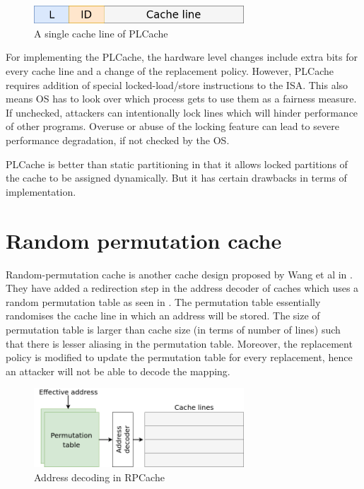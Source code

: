 \begin{figure}
    \centering
    \includegraphics[width=0.7\textwidth]{pl-cache}
    \caption{A single cache line of PLCache}
    \label{fig:plcache}
\end{figure}

For implementing the PLCache, the hardware level changes include extra bits for every cache line and a change of the
replacement policy. However, PLCache requires addition of special locked-load/store instructions to the ISA. This
also means OS has to look over which process gets to use them as a fairness measure. If unchecked, attackers can intentionally
lock lines which will hinder performance of other programs. Overuse or abuse of the locking feature can lead to severe
performance degradation, if not checked by the OS.

PLCache is better than static partitioning in that it allows locked partitions of the cache to be assigned dynamically.
But it has certain drawbacks in terms of implementation.

\section{Random permutation cache}

Random-permutation cache is another cache design proposed by Wang et al in .
They have added a redirection step in the address decoder of caches which uses a random permutation
table as seen in . 
The permutation table essentially randomises the cache line in which an address will be stored.
The size of permutation table is larger than cache size (in terms of number of lines) such that there is
lesser aliasing in the permutation table. Moreover, the replacement policy is modified to update the permutation
table for every replacement, hence an attacker will not be able to decode the mapping.

\begin{figure}
    \centering
    \includegraphics[width=0.7\textwidth]{rp-cache}
    \caption{Address decoding in RPCache}
    \label{fig:rpcache}
\end{figure}

